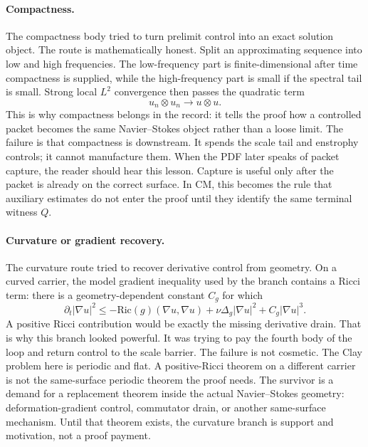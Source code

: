 \paragraph{Compactness.}
The compactness body tried to turn prelimit control into an exact solution
object.
The route is mathematically honest.
Split an approximating sequence into low and high frequencies.
The low-frequency part is finite-dimensional after time compactness is
supplied, while the high-frequency part is small if the spectral tail is small.
Strong local \(L^2\) convergence then passes the quadratic term
\[
  u_n\otimes u_n\to u\otimes u .
\]
This is why compactness belongs in the record: it tells the proof how a
controlled packet becomes the same Navier--Stokes object rather than a loose
limit.
The failure is that compactness is downstream.
It spends the scale tail and enstrophy controls; it cannot manufacture them.
When the PDF later speaks of packet capture, the reader should hear this
lesson.
Capture is useful only after the packet is already on the correct surface.
In CM, this becomes the rule that auxiliary estimates do not enter the proof
until they identify the same terminal witness \(Q\).

\paragraph{Curvature or gradient recovery.}
The curvature route tried to recover derivative control from geometry.
On a curved carrier, the model gradient inequality used by the branch contains
a Ricci term: there is a geometry-dependent constant \(C_g\) for which
\[
  \partial_t|\nabla u|^2
  \le
  -\mathrm{Ric}(g)(\nabla u,\nabla u)
  +\nu\Delta_g|\nabla u|^2
  +C_g|\nabla u|^3 .
\]
A positive Ricci contribution would be exactly the missing derivative drain.
That is why this branch looked powerful.
It was trying to pay the fourth body of the loop and return control to the
scale barrier.
The failure is not cosmetic.
The Clay problem here is periodic and flat.
A positive-Ricci theorem on a different carrier is not the same-surface
periodic theorem the proof needs.
The survivor is a demand for a replacement theorem inside the actual
Navier--Stokes geometry: deformation-gradient control, commutator drain, or
another same-surface mechanism.
Until that theorem exists, the curvature branch is support and motivation, not
a proof payment.

